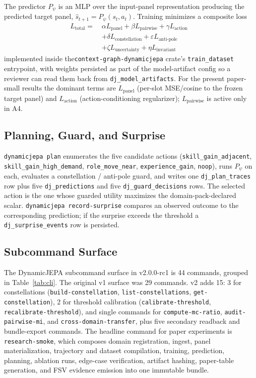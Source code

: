 \documentclass[10pt,twocolumn,letterpaper]{article}
\newcommand{\code}[1]{\texttt{\small #1}}
\begin{document}
The predictor $P_\psi$ is an MLP over the input-panel
representation producing the predicted target panel,
$\hat{s}_{t+1} = P_\psi(s_t, a_t)$. Training minimizes a composite
loss
\begin{align*}
L_{\text{total}} =\ &
  \alpha L_{\text{panel}} + \beta L_{\text{pairwise}}
+ \gamma L_{\text{action}} \\
& + \delta L_{\text{constellation}} + \varepsilon L_{\text{anti-pole}}\\
& + \zeta L_{\text{uncertainty}} + \eta L_{\text{invariant}}
\end{align*}
implemented inside the\linebreak \code{context-graph-dynamicjepa} crate's
\code{train\_dataset} entrypoint, with weights persisted as part of
the model-artifact config so a
reviewer can read them back from \code{dj\_model\_artifacts}. For
the present paper-small results the dominant terms are
$L_{\text{panel}}$ (per-slot MSE/cosine to the frozen target panel)
and $L_{\text{action}}$ (action-conditioning regularizer);
$L_{\text{pairwise}}$ is active only in A4.

\subsection{Planning, Guard, and Surprise}

\code{dynamicjepa plan} enumerates the five candidate actions
(\code{skill\_gain\_adjacent}, \code{skill\_gain\_high\_demand},
\code{role\_move\_near}, \code{experience\_gain},
\code{noop}), runs $P_\psi$ on each, evaluates a constellation /
anti-pole guard, and writes one \code{dj\_plan\_traces} row plus
five \code{dj\_predictions} and five \code{dj\_guard\_decisions}
rows. The selected action is the one whose guarded utility
maximizes the domain-pack-declared scalar.
\code{dynamicjepa record-surprise} compares an observed outcome to
the corresponding prediction; if the surprise exceeds the threshold
a \code{dj\_surprise\_events} row is persisted.

\subsection{Subcommand Surface}
\label{sec:method:cli}

The DynamicJEPA subcommand surface in v2.0.0-rc1 is 44 commands,
grouped in Table~\ref{tab:cli}. The original v1 surface was 29
commands. v2 adds 15: 3 for constellations
(\code{build-constellation}, \code{list-constellations},
\code{get-constellation}), 2 for threshold calibration
(\code{calibrate-threshold}, \code{recalibrate-threshold}), and
single commands for \code{compute-mc-ratio},
\code{audit-pairwise-mi}, and \code{cross-domain-transfer}, plus
five secondary readback and bundle-export commands. The headline
command for paper experiments is \code{research-smoke}, which
composes domain registration, ingest, panel materialization,
trajectory and dataset compilation, training, prediction, planning,
ablation runs, edge-case verification, artifact hashing,
paper-table generation, and FSV evidence emission into one
immutable bundle.
\end{document}
